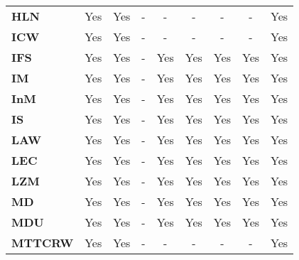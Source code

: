 \begin{table}[ht!]
\begin{tabular}{lcccccccc}
\textbf{HLN}         & Yes             & Yes             & -                   & -              & -                    & -                     & -                     & Yes             \\
\textbf{ICW}         & Yes             & Yes             & -                   & -              & -                    & -                     & -                     & Yes             \\
\textbf{IFS}         & Yes             & Yes             & -                   & Yes            & Yes                  & Yes                   & Yes                   & Yes             \\
\textbf{IM}          & Yes             & Yes             & -                   & Yes            & Yes                  & Yes                   & Yes                   & Yes             \\
\textbf{InM}         & Yes             & Yes             & -                   & Yes            & Yes                  & Yes                   & Yes                   & Yes             \\
\textbf{IS}          & Yes             & Yes             & -                   & Yes            & Yes                  & Yes                   & Yes                   & Yes             \\
\textbf{LAW}         & Yes             & Yes             & -                   & Yes            & Yes                  & Yes                   & Yes                   & Yes             \\
\textbf{LEC}         & Yes             & Yes             & -                   & Yes            & Yes                  & Yes                   & Yes                   & Yes             \\
\textbf{LZM}         & Yes             & Yes             & -                   & Yes            & Yes                  & Yes                   & Yes                   & Yes             \\
\textbf{MD}          & Yes             & Yes             & -                   & Yes            & Yes                  & Yes                   & Yes                   & Yes             \\
\textbf{MDU}         & Yes             & Yes             & -                   & Yes            & Yes                  & Yes                   & Yes                   & Yes             \\
\textbf{MTTCRW}      & Yes             & Yes             & -                   & -              & -                    & -                     & -                     & Yes             \\

\end{tabular}
\end{table}
